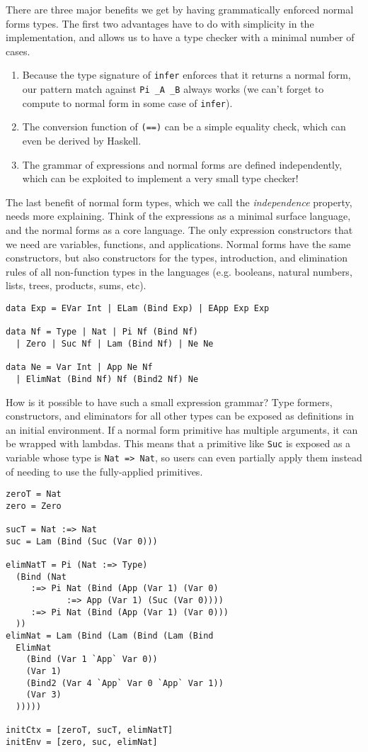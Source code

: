 \documentclass[preprint,authoryear]{sigplanconf}
\begin{document}
There are three major benefits we get by having grammatically enforced
normal forms types. The first two advantages have to do with
simplicity in the implementation, and allows us to have a type checker
with a minimal number of cases.

\begin{enumerate}
\item Because the type signature of \texttt{infer} enforces that it
  returns a normal form, our pattern match against \texttt{Pi \_A \_B}
  always works (we can't forget to compute to normal form in some case
  of \texttt{infer}).
\item The conversion function of \texttt{(==)} can be a simple
  equality check, which can even be derived by Haskell.
\item The grammar of expressions and normal forms are defined
  independently, which can be exploited to implement a very small type
  checker!
\end{enumerate}

The last benefit of normal form types, which we call the
 {\it independence} property, needs more explaining. Think of
the expressions as a minimal surface language, and the
normal forms as a core language. The only expression constructors that we
need are variables, functions, and applications. Normal forms have the
same constructors, but also constructors for the types, introduction,
and elimination rules of all non-function types in the languages (e.g.
booleans, natural numbers, lists, trees, products, sums, etc).

\begin{verbatim}
data Exp = EVar Int | ELam (Bind Exp) | EApp Exp Exp

data Nf = Type | Nat | Pi Nf (Bind Nf)
  | Zero | Suc Nf | Lam (Bind Nf) | Ne Ne

data Ne = Var Int | App Ne Nf
  | ElimNat (Bind Nf) Nf (Bind2 Nf) Ne
\end{verbatim}

How is it possible to have such a small expression grammar? Type
formers, constructors, and eliminators for all other types can be
exposed as definitions in an initial environment. If a normal form
primitive has multiple arguments, it can be wrapped with lambdas. This
means that a primitive like \texttt{Suc} is exposed as a variable
whose type is \texttt{Nat => Nat}, so users can even partially apply
them instead of needing to use the fully-applied primitives. 

\begin{verbatim}
zeroT = Nat
zero = Zero

sucT = Nat :=> Nat
suc = Lam (Bind (Suc (Var 0)))

elimNatT = Pi (Nat :=> Type)
  (Bind (Nat
     :=> Pi Nat (Bind (App (Var 1) (Var 0)
            :=> App (Var 1) (Suc (Var 0))))
     :=> Pi Nat (Bind (App (Var 1) (Var 0)))
  ))
elimNat = Lam (Bind (Lam (Bind (Lam (Bind
  ElimNat
    (Bind (Var 1 `App` Var 0))
    (Var 1)
    (Bind2 (Var 4 `App` Var 0 `App` Var 1))
    (Var 3)
  )))))

initCtx = [zeroT, sucT, elimNatT]
initEnv = [zero, suc, elimNat]
\end{verbatim}
\end{document}
